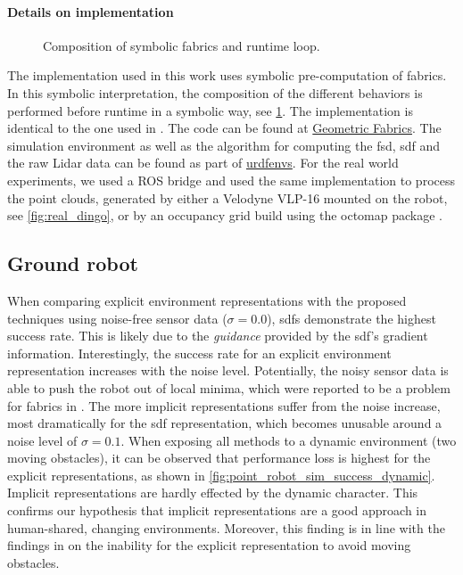 \paragraph{Details on implementation}
%
\begin{figure}
  \centering
  
  \caption{Composition of symbolic \ac{fabrics} and runtime loop.}
  \label{fig:composition_symbolic_fabrics}
\end{figure}
%
The implementation used in this work uses symbolic
pre-computation of \ac{fabrics}. In this symbolic
interpretation, the composition of the different behaviors
is performed before runtime in a symbolic way, see
\cref{fig:composition_symbolic_fabrics}. The implementation
is identical to the one used
in \cite{spahn2023autotuning}. The code can be found at
\href{www.github.com/tud-amr/fabrics}{Geometric Fabrics}. The simulation
environment as well as the algorithm for computing the \ac{fsd}, \ac{sdf}
and the raw Lidar data can be found as part of
\href{www.github.com/maxspahn/gym_envs_urdf}{urdfenvs}. For the real world
experiments, we used a ROS bridge and used the same
implementation to process the point clouds, generated by
either a Velodyne VLP-16 mounted on the robot, see
\cref{fig:real_dingo}, or by an occupancy grid build using
the octomap package \cite{Hornung2013}.

\subsection{Ground robot}
\label{sub:point_robot}

When comparing explicit environment representations with the proposed techniques
using noise-free sensor data ($\sigma=0.0$), \acp{sdf} demonstrate the highest
success rate. This is likely due to the \textit{guidance} provided by the
\ac{sdf}'s gradient information. Interestingly, the success
rate for an explicit environment representation increases
with the noise level. Potentially, the noisy sensor data is
able to push the robot out of local minima, which were
reported to be a problem for \ac{fabrics} in
\cite{Spahn2023}. The more implicit representations suffer
from the noise increase, most dramatically for the
\ac{sdf} representation, which becomes unusable around a
noise level of $\sigma=0.1$. When exposing all methods to a
dynamic environment (two moving obstacles), it can be
observed that performance loss is highest for the explicit
representations, as shown in
\cref{fig:point_robot_sim_success_dynamic}. Implicit
representations are hardly effected by the dynamic
character. This confirms our hypothesis that implicit
representations are a good approach in human-shared,
changing environments. Moreover, this finding is in line with the findings in
\cite{Spahn2023} on the inability for the explicit
representation to avoid moving obstacles.

